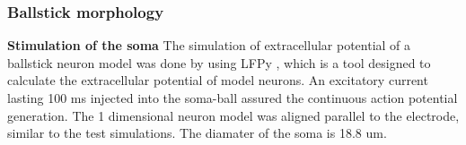 \documentclass[12pt,a4paper]{article}
\begin{document}
\subsubsection{Ballstick morphology}


\textbf{Stimulation of the soma}
The simulation of extracellular potential of a ballstick neuron model was done by using LFPy \cite{LFPy}, which is a tool designed to calculate the extracellular potential of model neurons. An excitatory current lasting 100 ms injected into the soma-ball assured the continuous action potential generation.  The 1 dimensional neuron model was aligned parallel to the electrode, similar to the test simulations. The diamater of the soma is 18.8 um. 





 



\end{document}
